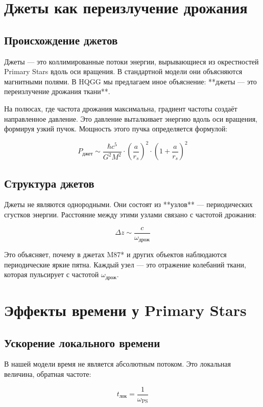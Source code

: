 \documentclass[12pt,a4paper]{article}
\begin{document}
\section{Джеты как переизлучение дрожания}

\subsection{Происхождение джетов}

Джеты — это коллимированные потоки энергии, вырывающиеся из окрестностей Primary Stars вдоль оси вращения. В стандартной модели они объясняются магнитными полями. В HQGG мы предлагаем иное объяснение: **джеты — это переизлучение дрожания ткани**.

На полюсах, где частота дрожания максимальна, градиент частоты создаёт направленное давление. Это давление выталкивает энергию вдоль оси вращения, формируя узкий пучок. Мощность этого пучка определяется формулой:

\[
P_{\text{джет}} \sim \frac{\hbar c^5}{G^2 M^2} \cdot \left(\frac{a}{r_s}\right)^2 \cdot \left(1 + \frac{a}{r_s}\right)^2
\]

\subsection{Структура джетов}

Джеты не являются однородными. Они состоят из **узлов** — периодических сгустков энергии. Расстояние между этими узлами связано с частотой дрожания:

\[
\Delta z \sim \frac{c}{\omega_{\text{дрож}}}
\]

Это объясняет, почему в джетах M87* и других объектов наблюдаются периодические яркие пятна. Каждый узел — это отражение колебаний ткани, которая пульсирует с частотой \(\omega_{\text{дрож}}\).

\section{Эффекты времени у Primary Stars}

\subsection{Ускорение локального времени}

В нашей модели время не является абсолютным потоком. Это локальная величина, обратная частоте:

\[
t_{\text{лок}} = \frac{1}{\omega_{\text{PS}}}
\]
\end{document}
